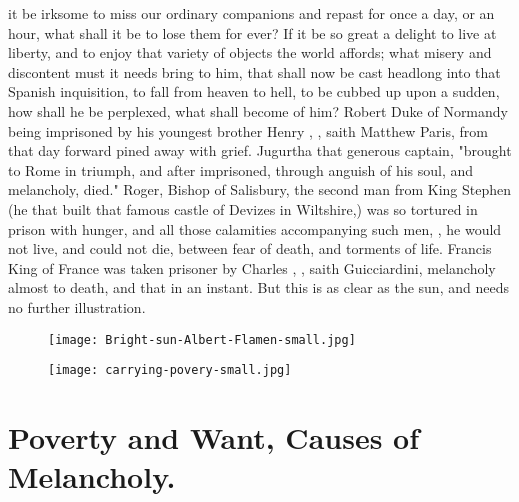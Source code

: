it be irksome to miss our ordinary companions and repast for once a day, or an
hour, what shall it be to lose them for ever? If it be so great a delight to
live at liberty, and to enjoy that variety of objects the world affords; what
misery and discontent must it needs bring to him, that shall now be cast
headlong into that Spanish inquisition, to fall from heaven to hell, to be
cubbed up upon a sudden, how shall he be perplexed, what shall become of him?
Robert Duke of Normandy being imprisoned by his youngest
brother Henry , ,
saith Matthew Paris, from that day forward pined away with grief.
Jugurtha that generous captain, "brought to Rome in
triumph, and after imprisoned, through anguish of his soul, and melancholy,
died." Roger, Bishop of Salisbury, the second man from
King Stephen (he that built that famous castle of Devizes
in Wiltshire,) was so tortured in prison with hunger, and all those calamities
accompanying such men, , he would not live, and could not die, between fear of death, and
torments of life. Francis King of France was taken prisoner by Charles ,
, saith Guicciardini, melancholy almost to
death, and that in an instant. But this is as clear as the sun, and needs no
further illustration.


\begin{figure}[H]
  \begingroup
  \centering
  \texttt{[image: Bright-sun-Albert-Flamen-small.jpg]}
  \label{fig:brightsun}
\end{figure}

\cleartoleftpage{}
\begin{figure}[p]
  \begingroup
  \centering
  \texttt{[image: carrying-povery-small.jpg]}
  \label{fig:povertyriches}
\end{figure}

\clearpage{}
\thispagestyle{titleontop}
\section{Poverty and Want, Causes of Melancholy.}\label{sec:poverty-and-want}

